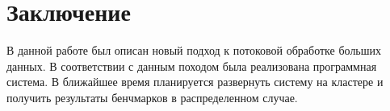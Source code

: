 \documentclass[14pt]{matmex-diploma-custom}
\begin{document}
\section*{Заключение}

В данной работе был описан новый подход к потоковой обработке больших данных. В соответствии с данным походом была реализована программная система. В ближайшее время планируется развернуть систему на кластере и получить результаты бенчмарков в распределенном случае.

\setmonofont[Mapping=tex-text]{CMU Typewriter Text}


\end{document}
